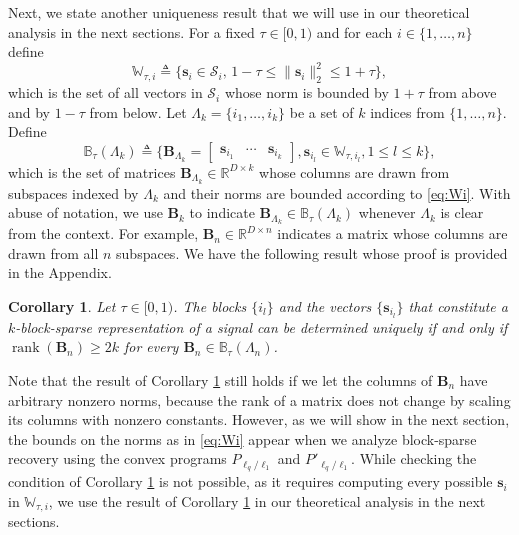 \documentclass[10pt,twocolumn,twoside] {IEEEtran}
\newtheorem{corollary}{Corollary}
\begin{document}
{Next, we state another uniqueness result 
that we will use in our theoretical analysis in the next sections. 
For a fixed $\tau \in [0,1)$ and for each $i \in \{1,\ldots, n\}$ define
\begin{equation}
\label{eq:Wi}
\mathbb{W}_{\tau, i} \triangleq \{ {\boldsymbol{s}}_i \in \mathcal{S}_i,\, 1-\tau \leq \| {\boldsymbol{s}}_{i} \|_2^2 \leq 1+\tau \},
\end{equation}
which is the set of all vectors in $\mathcal{S}_i$ whose norm is bounded by $1+\tau$ from above and by $1-\tau$ from below.
Let $\Lambda_k = \{ i_1, \ldots, i_k \}$ be a set of $k$ indices from $\{1, \ldots, n \}$. Define
\begin{equation}
\label{eq:mathbbB}
\mathbb{B}_{\tau}(\Lambda_k) \! \triangleq \! \{ {\boldsymbol{B}}_{\Lambda_k} \!=\! \begin{bmatrix} {\boldsymbol{s}}_{i_1} \!\!\!\!\!&\cdots  \!\!\!\!\!& {\boldsymbol{s}}_{i_k} \end{bmatrix}\!, {\boldsymbol{s}}_{i_l} \! \in \! \mathbb{W}_{\tau, i_l}, 1 \leq l \leq k \},
\end{equation}
which is the set of matrices ${\boldsymbol{B}}_{\Lambda_k} \in {\mathbb{R}}^{D \times k}$ whose columns are drawn from subspaces indexed by $\Lambda_k$ and their norms are bounded according to \eqref{eq:Wi}. With abuse of notation, we use ${\boldsymbol{B}}_k$ to indicate ${\boldsymbol{B}}_{\Lambda_k} \in \mathbb{B}_{\tau}(\Lambda_k)$ whenever $\Lambda_k$ is clear from the context. For example, ${\boldsymbol{B}}_n \in {\mathbb{R}}^{D \times n}$ indicates a matrix whose columns are drawn from all $n$ subspaces.
We have the following result whose proof is provided in the Appendix. 
\vspace{1mm}
\begin{corollary}
\label{cor:uniqueness1}
Let $\tau \in [0,1)$. 
The blocks $\{ i_l \}$ and the vectors $\{ {\boldsymbol{s}}_{i_l} \}$ that constitute a $k$-block-sparse representation of a signal can be determined uniquely if and only if ${\operatorname{rank}}({\boldsymbol{B}}_{n}) \geq 2k$ for every ${\boldsymbol{B}}_{n} \in \mathbb{B}_{\tau}(\Lambda_n)$.
\end{corollary}
\vspace{1mm}

Note that the result of Corollary \ref{cor:uniqueness1} still holds if 
we let the columns of ${\boldsymbol{B}}_n$ have arbitrary nonzero norms, because the rank of a matrix does not change by scaling its columns with nonzero constants. However, as we will show in the next section, the bounds on the norms as in \eqref{eq:Wi} appear when we analyze block-sparse recovery using the convex programs $P_{\ell_q/\ell_1}$ and $P'_{\ell_q/\ell_1}$. While checking the condition of Corollary \ref{cor:uniqueness1} is not possible, as it requires computing every possible ${\boldsymbol{s}}_i$ in $\mathbb{W}_{\tau, i}$, we use the result of Corollary \ref{cor:uniqueness1} in our theoretical analysis in the next sections.

}
\end{document}
